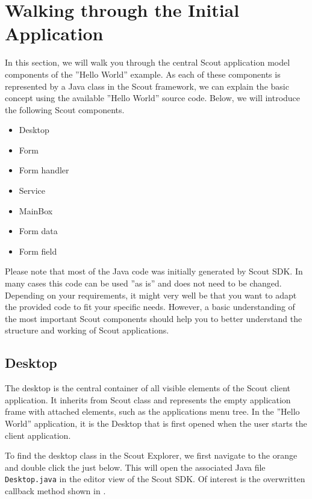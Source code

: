 \documentclass[a4paper,10pt,twoside]{book}
\begin{document}
\section{Walking through the Initial Application}

In this section, we will walk you through the central Scout application model components of the ''Hello World'' example. 
As each of these components is represented by a Java class in the Scout framework, we can explain the basic concept using the available ''Hello World'' source code.
Below, we will introduce the following Scout components.

\begin{itemize}
  \item Desktop
  \item Form
  \item Form handler
  \item Service
  \item MainBox
  \item Form data
  \item Form field
\end{itemize}

Please note that most of the Java code was initially generated by Scout SDK.
In many cases this code can be used ''as is'' and does not need to be changed.
Depending on your requirements, it might very well be that you want to adapt the provided code to fit your specific needs.
However, a basic understanding of the most important Scout components should help you to better understand the structure and working of Scout applications.

\subsection{Desktop}

The desktop is the central container of all visible elements of the Scout client application.
It inherits from Scout class  and represents the empty application frame with attached elements, such as the applications menu tree.
In the ''Hello World'' application, it is the Desktop that is first opened when the user starts the client application.

To find the desktop class in the Scout Explorer, we first navigate to the orange  and double click the  just below.
This will open the associated Java file \texttt{Desktop.java} in the editor view of the Scout SDK.
Of interest is the overwritten callback method  shown in .
\end{document}
